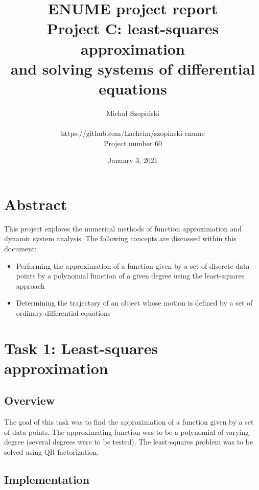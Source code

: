 \documentclass{article}
\begin{document}
	\title{ENUME project report\\Project C: least-squares approximation \\
	and solving systems of differential equations}
	\author{Michał Szopiński\\\\
	https://github.com/Lachcim/szopinski-enume\\
	Project number 60}
	\date{January 3, 2021}
	\maketitle
	
	
	\setcounter{section}{-1}
	\section{Abstract}
	
	This project explores the numerical methods of function approximation
	and dynamic system analysis. The following concepts are discussed within
	this document:
	
	\begin{itemize}
		\item Performing the approximation of a function given by a set of
		discrete data points by a polynomial function of a given degree
		using the least-squares approach
		\item Determining the trajectory of an object whose motion is
		defined by a set of ordinary differential equations
	\end{itemize}
	
	\newpage
	
	\section{Task 1: Least-squares approximation}
	
	\subsection{Overview}
	
	The goal of this task was to find the approximation of a function given
	by a set of data points. The approximating function was to be a
	polynomial of varying degree (several degrees were to be tested). The
	least-squares problem was to be solved using QR factorization.
	
	\subsection{Implementation}
	
\end{document}
